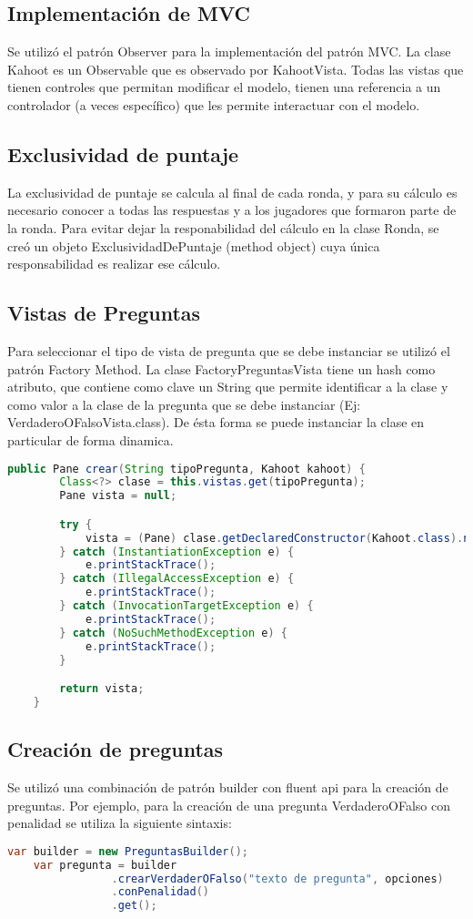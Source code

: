 \documentclass[titlepage,a4paper]{article}
\begin{document}
\subsection{Implementación de MVC} Se utilizó el patrón Observer para la implementación del patrón MVC. La clase Kahoot es un Observable que es observado por KahootVista. Todas las vistas que tienen controles que permitan modificar el modelo, tienen una referencia a un controlador (a veces específico) que les permite interactuar con el modelo.
\subsection{Exclusividad de puntaje} La exclusividad de puntaje se calcula al final de cada ronda, y para su cálculo es necesario conocer a todas las respuestas y a los jugadores que formaron parte de la ronda. Para evitar dejar la responabilidad del cálculo en la clase Ronda, se creó un objeto ExclusividadDePuntaje (method object) cuya única responsabilidad es realizar ese cálculo.
\subsection{Vistas de Preguntas} Para seleccionar el tipo de vista de pregunta que se debe instanciar se utilizó el patrón Factory Method. La clase FactoryPreguntasVista tiene un hash como atributo, que contiene como clave un String que permite identificar a la clase y como valor a la clase de la pregunta que se debe instanciar (Ej: VerdaderoOFalsoVista.class). De ésta forma se puede instanciar la clase en particular de forma dinamica.
\begin{lstlisting}[language=java]
    public Pane crear(String tipoPregunta, Kahoot kahoot) {
        Class<?> clase = this.vistas.get(tipoPregunta);
        Pane vista = null;

        try {
            vista = (Pane) clase.getDeclaredConstructor(Kahoot.class).newInstance(kahoot);
        } catch (InstantiationException e) {
            e.printStackTrace();
        } catch (IllegalAccessException e) {
            e.printStackTrace();
        } catch (InvocationTargetException e) {
            e.printStackTrace();
        } catch (NoSuchMethodException e) {
            e.printStackTrace();
        }

        return vista;
    }

\end{lstlisting}

\subsection{Creación de preguntas} Se utilizó una combinación de patrón builder con fluent api para la creación de preguntas. Por ejemplo, para la creación de una pregunta VerdaderoOFalso con penalidad se utiliza la siguiente sintaxis:
\begin{lstlisting}[language=java]
    var builder = new PreguntasBuilder();
    var pregunta = builder
                .crearVerdaderOFalso("texto de pregunta", opciones)
                .conPenalidad()
                .get();
\end{lstlisting}
\end{document}
